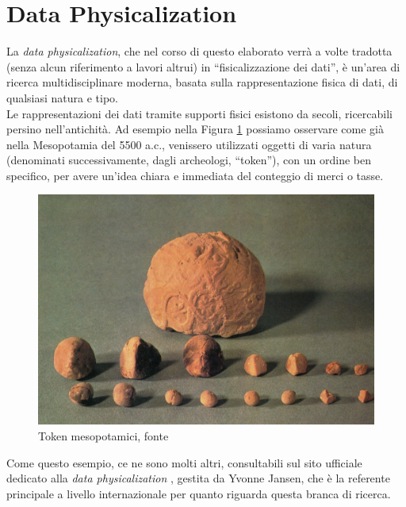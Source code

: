 \documentclass[12pt,a4paper]{report}
\begin{document}
\section{Data Physicalization}\label{sec:dataphys}

La \textit{data physicalization}, che nel corso di questo elaborato verrà a volte tradotta (senza alcun riferimento a lavori altrui) in ``fisicalizzazione dei dati'', è un'area di ricerca multidisciplinare moderna, basata sulla rappresentazione fisica di dati, di qualsiasi natura e tipo. \\
Le rappresentazioni dei dati tramite supporti fisici esistono da secoli, ricercabili persino nell'antichità. Ad esempio nella Figura \ref{fig:mesopotamiantokens} possiamo osservare come già nella Mesopotamia del 5500 a.c., venissero utilizzati oggetti di varia natura (denominati successivamente, dagli archeologi, ``token''\cite{mesopotamianTokens}), con un ordine ben specifico, per avere un'idea chiara e immediata del conteggio di merci o tasse.


\begin{figure}
	\begin{center}
		\includegraphics[scale=0.7]{Immagini/mesopotamian_tokens.jpg}
		\caption{Token mesopotamici, fonte \cite{mesopotamianTokens}}
		\label{fig:mesopotamiantokens}
	\end{center}
\end{figure}


Come questo esempio, ce ne sono molti altri, consultabili sul sito ufficiale dedicato alla \textit{data physicalization} \cite{dataphys_org_list}, gestita da Yvonne Jansen, che  è la referente principale a livello internazionale per quanto riguarda questa branca di ricerca.\\ 
\end{document}
